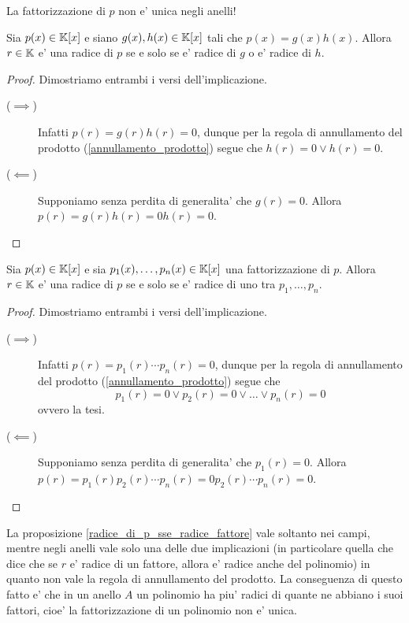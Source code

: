 \begin{remark}
    La fattorizzazione di $p$ non e' unica negli anelli!
\end{remark}

\begin{proposition}\label{radice_di_p_sse_radice_fattore}
    Sia $p(x) \in \mathbb{K}[x]$ e siano $g(x), h(x) \in \mathbb{K}[x]$ tali che $p(x) = g(x)h(x)$. Allora $r \in \mathbb{K}$ e' una radice di $p$ se e solo se e' radice di $g$ o e' radice di $h$.
\end{proposition}
\begin{proof}
    Dimostriamo entrambi i versi dell'implicazione.
    \begin{description}
        \item[($\implies$)] Infatti $p(r) = g(r)h(r) = 0$, dunque per la regola di annullamento del prodotto (\ref{annullamento_prodotto}) segue che $h(r) = 0 \lor h(r) = 0$.
        \item[($\impliedby$)] Supponiamo senza perdita di generalita' che $g(r) = 0$. Allora $p(r) = g(r)h(r) = 0h(r) = 0$. \qedhere 
    \end{description}
\end{proof}
\begin{corollary}
    Sia $p(x) \in \mathbb{K}[x]$ e sia $p_1(x), \dots, p_n(x) \in \mathbb{K}[x]$ una fattorizzazione di $p$. Allora $r \in \mathbb{K}$ e' una radice di $p$ se e solo se e' radice di uno tra $p_1, \dots, p_n$.
\end{corollary}
\begin{proof}
    Dimostriamo entrambi i versi dell'implicazione.
    \begin{description}
        \item[($\implies$)] Infatti $p(r) = p_1(r) \cdots p_n(r) = 0$, dunque per la regola di annullamento del prodotto (\ref{annullamento_prodotto}) segue che \[
            p_1(r) = 0 \lor p_2(r) = 0 \lor \dots \lor p_n(r) = 0    
        \] ovvero la tesi.
        \item[($\impliedby$)] Supponiamo senza perdita di generalita' che $p_1(r) = 0$. Allora $p(r) = p_1(r)p_2(r)\cdots p_n(r) = 0p_2(r)\cdots p_n(r) = 0$. \qedhere
    \end{description} 
\end{proof}

\begin{remark}
    La proposizione \ref{radice_di_p_sse_radice_fattore} vale soltanto nei campi, mentre negli anelli vale solo una delle due implicazioni (in particolare quella che dice che se $r$ e' radice di un fattore, allora e' radice anche del polinomio) in quanto non vale la regola di annullamento del prodotto. La conseguenza di questo fatto e' che in un anello $A$ un polinomio ha piu' radici di quante ne abbiano i suoi fattori, cioe' la fattorizzazione di un polinomio non e' unica.
\end{remark}


